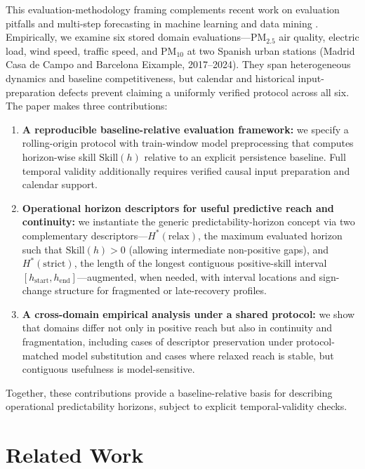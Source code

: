 \documentclass[pdflatex,sn-mathphys]{sn-jnl}
\begin{document}
This evaluation-methodology framing complements recent work on evaluation pitfalls and multi-step forecasting in machine learning and data mining \citep{hewamalage2023dmkd,green2025stratify,kreuzer2025trend,cerqueira2020,modelradar2025}.
Empirically, we examine six stored domain evaluations—PM$_{2.5}$ air quality, electric load, wind speed, traffic speed, and PM$_{10}$ at two Spanish urban stations (Madrid Casa de Campo and Barcelona Eixample, 2017–2024). They span heterogeneous dynamics and baseline competitiveness, but calendar and historical input-preparation defects prevent claiming a uniformly verified protocol across all six.
The paper makes three contributions:
\begin{enumerate}
  \item \textbf{A reproducible baseline-relative evaluation framework:} we specify a rolling-origin protocol with train-window model preprocessing that computes horizon-wise skill $\mathrm{Skill}(h)$ relative to an explicit persistence baseline. Full temporal validity additionally requires verified causal input preparation and calendar support.
  \item \textbf{Operational horizon descriptors for useful predictive reach and continuity:} we instantiate the generic predictability-horizon concept via two complementary descriptors—$H^*(\mathrm{relax})$, the maximum evaluated horizon such that $\mathrm{Skill}(h)>0$ (allowing intermediate non-positive gaps), and $H^*(\mathrm{strict})$, the length of the longest contiguous positive-skill interval $[h_{\mathrm{start}},h_{\mathrm{end}}]$—augmented, when needed, with interval locations and sign-change structure for fragmented or late-recovery profiles.
  \item \textbf{A cross-domain empirical analysis under a shared protocol:} we show that domains differ not only in positive reach but also in continuity and fragmentation, including cases of descriptor preservation under protocol-matched model substitution and cases where relaxed reach is stable, but contiguous usefulness is model-sensitive.
\end{enumerate}
Together, these contributions provide a baseline-relative basis for describing operational predictability horizons, subject to explicit temporal-validity checks.

\section{Related Work}
\end{document}
